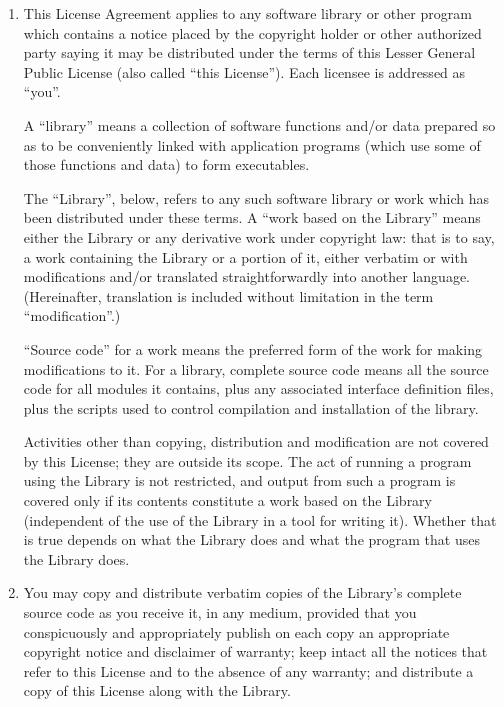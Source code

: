 \begin{enumerate}
\item

This License Agreement applies to any software library or other program
which contains a notice placed by the copyright holder or other
authorized party saying it may be distributed under the terms of this
Lesser General Public License (also called ``this License'').  Each
licensee is addressed as ``you''.

  A ``library'' means a collection of software functions and/or data
prepared so as to be conveniently linked with application programs
(which use some of those functions and data) to form executables.

  The ``Library'', below, refers to any such software library or work
which has been distributed under these terms.  A ``work based on the
Library'' means either the Library or any derivative work under
copyright law: that is to say, a work containing the Library or a
portion of it, either verbatim or with modifications and/or translated
straightforwardly into another language.  (Hereinafter, translation is
included without limitation in the term ``modification''.)

  ``Source code'' for a work means the preferred form of the work for
making modifications to it.  For a library, complete source code means
all the source code for all modules it contains, plus any associated
interface definition files, plus the scripts used to control compilation
and installation of the library.

  Activities other than copying, distribution and modification are not
covered by this License; they are outside its scope.  The act of
running a program using the Library is not restricted, and output from
such a program is covered only if its contents constitute a work based
on the Library (independent of the use of the Library in a tool for
writing it).  Whether that is true depends on what the Library does
and what the program that uses the Library does.

\item

You may copy and distribute verbatim copies of the Library's
complete source code as you receive it, in any medium, provided that
you conspicuously and appropriately publish on each copy an
appropriate copyright notice and disclaimer of warranty; keep intact
all the notices that refer to this License and to the absence of any
warranty; and distribute a copy of this License along with the
Library.


\end{enumerate}
